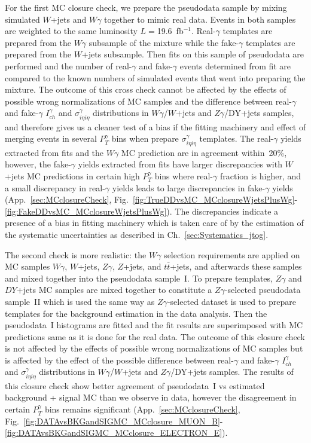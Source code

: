 For the first MC closure check, we prepare the pseudodata sample by mixing simulated $W$+jets and $W\gamma$ together to mimic real data. Events in both samples are weighted to the same luminosity $L=$19.6~fb$^{-1}$. Real-$\gamma$ templates are prepared from the $W\gamma$ subsample of the mixture while the fake-$\gamma$ templates are prepared from the $W$+jets subsample. Then fits on this sample of pseudodata are performed and the number of real-$\gamma$ and fake-$\gamma$ events determined from fit are compared to the known numbers of simulated events that went into preparing the mixture. The outcome of this cross check cannot be affected by the effects of possible wrong normalizations of MC samples and the difference between real-$\gamma$ and fake-$\gamma$ $I_{ch}^{\gamma}$ and $\sigma_{i\eta i\eta}^{\gamma}$ distributions in $W\gamma$/$W$+jets and $Z\gamma$/DY+jets samples, and therefore gives us a cleaner test of a bias if the fitting machinery and effect of merging events in several $P_T^{\gamma}$ bins when prepare $\sigma_{i\eta i\eta}^{\gamma}$ templates. The real-$\gamma$ yields extracted from fits and the $W\gamma$ MC prediction are in agreement within~20\%, however, the fake-$\gamma$ yields extracted from fits have larger discrepancies with $W$+jets MC predictions in certain high $P_T^{\gamma}$ bins where real-$\gamma$ fraction is higher, and a small discrepancy in real-$\gamma$ yields leads to large discrepancies in fake-$\gamma$ yields (App.~\ref{sec:MCclosureCheck}, Fig.~\ref{fig:TrueDDvsMC_MCclosureWjetsPlusWg}-\ref{fig:FakeDDvsMC_MCclosureWjetsPlusWg}). The discrepancies indicate a presence of a bias in fitting machinery which is taken care of by the estimation of the systematic uncertainties as described in Ch.~\ref{sec:Systematics_jtog}.

The second check is more realistic: the $W\gamma$ selection requirements are applied on MC samples $W\gamma$, $W$+jets, $Z\gamma$, $Z$+jets, and $t\bar{t}$+jets, and afterwards these samples and mixed together into the pseudodata sample~I. To prepare templates, $Z\gamma$ and $DY$+jets MC samples are mixed together to constitute a $Z\gamma$-selected pseudodata sample~II which is used the same way as $Z\gamma$-selected dataset is used to prepare templates for the background estimation in the data analysis. Then the pseudodata~I histograms are fitted and the fit results are superimposed with MC predictions same as it is done for the real data. The outcome of this closure check is not affected by the effects of possible wrong normalizations of MC samples but is affected by the effect of the possible difference between real-$\gamma$ and fake-$\gamma$ $I_{ch}^{\gamma}$ and $\sigma_{i\eta i\eta}^{\gamma}$ distributions in $W\gamma$/$W$+jets and $Z\gamma$/DY+jets samples. The results of this closure check show better agreement of pseudodata~I vs estimated background + signal MC than we observe in data, however the disagreement in certain $P_T^{\gamma}$ bins remains significant (App.~\ref{sec:MCclosureCheck}, Fig.~\ref{fig:DATAvsBKGandSIGMC_MCclosure_MUON_B}-\ref{fig:DATAvsBKGandSIGMC_MCclosure_ELECTRON_E}).

